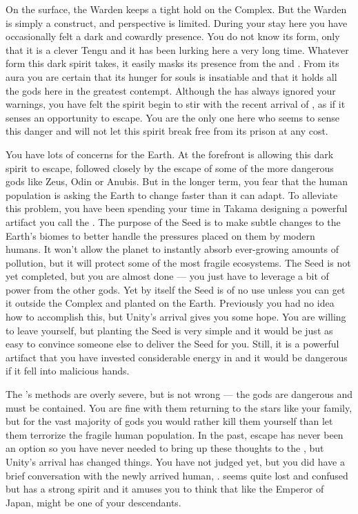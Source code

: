 \documentclass[char]{guardians}
\begin{document}
On the surface, the Warden keeps a tight hold on the Complex. But the Warden is simply a construct, and \cWarden{\their} perspective is limited. During your stay here you have occasionally felt a dark and cowardly presence. You do not know its form, only that it is a clever Tengu and it has been lurking here a very long time. Whatever form this dark spirit takes, it easily masks its presence from the \cWarden{} and \cCaretaker{}. From its aura you are certain that its hunger for souls is insatiable and that it holds all the gods here in the greatest contempt. Although the \cWarden{} has always ignored your warnings, you have felt the spirit begin to stir with the recent arrival of \cUnity{}, as if it senses an opportunity to escape. You are the only one here who seems to sense this danger and will not let this spirit break free from its prison at any cost.

You have lots of concerns for the Earth. At the forefront is allowing this dark spirit to escape, followed closely by the escape of some of the more dangerous gods like Zeus, Odin or Anubis. But in the longer term, you fear that the human population is asking the Earth to change faster than it can adapt. To alleviate this problem, you have been spending your time in Takama designing a powerful artifact you call the \iSeed{\MYname}. The purpose of the Seed is to make subtle changes to the Earth's biomes to better handle the pressures placed on them by modern humans. It won't allow the planet to instantly absorb ever-growing amounts of pollution, but it will protect some of the most fragile ecosystems. The Seed is not yet completed, but you are almost done --- you just have to leverage a bit of power from the other gods. Yet by itself the Seed is of no use unless you can get it outside the Complex and planted on the Earth. Previously you had no idea how to accomplish this, but Unity's arrival gives you some hope. You are willing to leave yourself, but planting the Seed is very simple and it would be just as easy to convince someone else to deliver the Seed for you. Still, it is a powerful artifact that you have invested considerable energy in and it would be dangerous if it fell into malicious hands.

The \cWarden{}'s methods are overly severe, but \cWarden{\they} is not wrong --- the gods are dangerous and must be contained. You are fine with them returning to the stars like your family, but for the vast majority of gods you would rather kill them yourself than let them terrorize the fragile human population. In the past, escape has never been an option so you have never needed to bring up these thoughts to the \cWarden{}, but Unity's arrival has changed things. You have not judged \cUnity{} yet, but you did have a brief conversation with the newly arrived human, \cKachiko{}. \cKachiko{\They} seems quite lost and confused but \cKachiko{\they} has a strong spirit and it amuses you to think that like the Emperor of Japan, \cKachiko{\they} might be one of your descendants.
\end{document}
